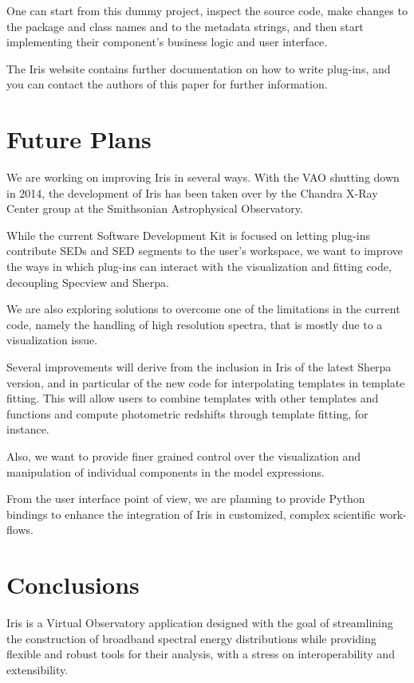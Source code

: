 \documentclass[preprint,authoryear,5p]{elsarticle}
\begin{document}
One can start from this dummy project, inspect the source code, make changes to
the package and class names and to the metadata strings, and then start
implementing their component's business logic and user interface.

The Iris website contains further documentation on how to write plug-ins, and
you can contact the authors of this paper for further information.

\section{Future Plans} We are working on improving Iris in several ways. With
the VAO shutting down in 2014, the development of Iris has been taken over by
the Chandra X-Ray Center group at the Smithsonian Astrophysical Observatory.

While the current Software Development Kit is focused on letting plug-ins
contribute SEDs and SED segments to the user's workspace, we want to improve the
ways in which plug-ins can interact with the visualization and fitting code,
decoupling Specview and Sherpa.

We are also exploring solutions to overcome one of the limitations in the
current code, namely the handling of high resolution spectra, that is mostly due
to a visualization issue.

Several improvements will derive from the inclusion in Iris of the latest Sherpa
version, and in particular of the new code for interpolating templates in
template fitting. This will allow users to combine templates with other
templates and functions and compute photometric redshifts through template
fitting, for instance.

Also, we want to provide finer grained control over the visualization and
manipulation of individual components in the model expressions.

From the user interface point of view, we are planning to provide Python
bindings to enhance the integration of Iris in customized, complex scientific
work-flows.

\section{Conclusions} \label{sec:conclusions}

Iris is a Virtual Observatory application designed with the goal of streamlining
the construction of broadband spectral energy distributions while providing
flexible and robust tools for their analysis, with a stress on interoperability
and extensibility.
\end{document}

